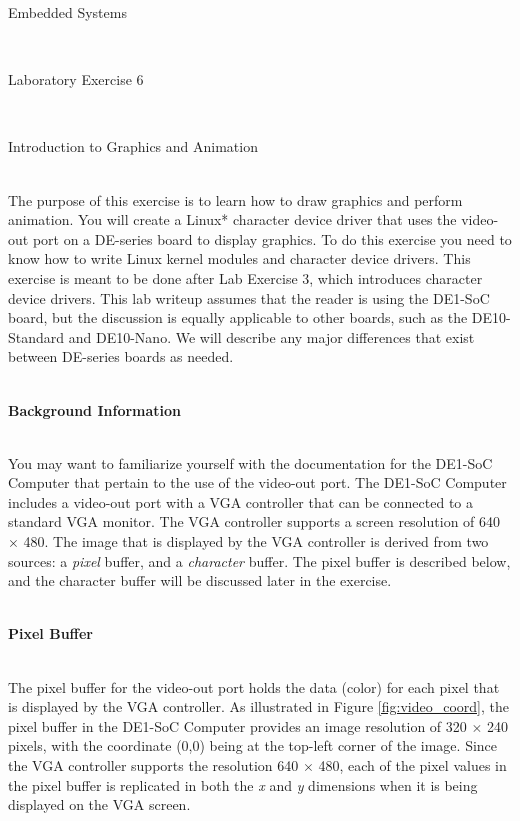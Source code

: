 \documentclass[epsfig,10pt,fullpage]{article}
\newcommand{\LabNum}{6}
\begin{document}
\centerline{\huge Embedded Systems}
~\\
\centerline{\huge Laboratory Exercise \LabNum}
~\\
\centerline{\large Introduction to Graphics and Animation}
~\\

\noindent
The purpose of this exercise is to learn how to draw graphics and perform animation. You will 
create a Linux* character device driver that uses the video-out port on a DE-series board to
display graphics. To do this exercise you need to know how to write Linux kernel modules and 
character device drivers. This exercise is meant to be done after Lab Exercise 3, which 
introduces character device drivers. This lab writeup assumes that the reader is using the 
DE1-SoC board, but the discussion is equally applicable to other boards, such as the 
DE10-Standard and DE10-Nano. We will describe any major differences that exist between 
DE-series boards as needed. 

~\\
\noindent
{\bf Background Information}

~\\
\noindent
You may want to familiarize yourself with the documentation for the DE1-SoC Computer that 
pertain to the use of the video-out port. The DE1-SoC Computer includes a video-out port 
with a VGA controller that can be connected to a standard VGA monitor. The VGA controller 
supports a screen resolution of 640 $\times$ 480. The image that is displayed by the 
VGA controller is derived from two sources: a {\it pixel} buffer, and a {\it character} 
buffer. The pixel buffer is described below, and the character buffer will be discussed 
later in the exercise.

~\\
\noindent
{\bf Pixel Buffer}
\label{sec:pixel_buffer}

~\\
\noindent
The pixel buffer for the video-out port holds the data (color) for each pixel that is 
displayed by the VGA controller.  As illustrated in Figure \ref{fig:video_coord}, the
pixel buffer in the DE1-SoC Computer provides an image resolution of 320 $\times$ 240 pixels,
with the coordinate (0,0) being at the top-left corner of the image.  Since the VGA 
controller supports the resolution 640 $\times$ 480, each of the pixel values in the pixel 
buffer is replicated in both the {\it x} and {\it y} dimensions when it is being displayed 
on the VGA screen.
\end{document}
